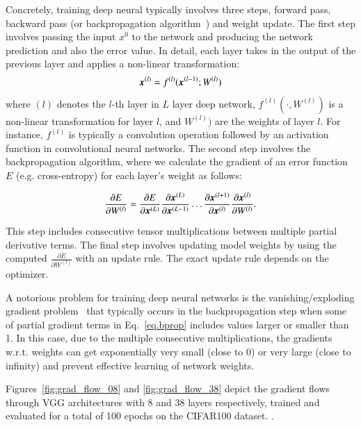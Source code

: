 \documentclass{article}
\begin{document}
\questionFigureThree

Concretely, training deep neural typically involves three steps, forward
pass, backward pass (or backpropagation algorithm~\cite{rumelhart1986learning}) and weight update.
The first step involves passing the input $x^0$ to the network and producing 
the network prediction and also the error value.
In detail, each layer takes in the output of the previous layer and applies
a non-linear transformation:
\begin{equation}
\label{eq.fprop}
\bm{x}^{(l)} = f^{(l)}(\bm{x}^{(l-1)}; W^{(l)})    
\end{equation} 
where $(l)$ denotes the $l$-th layer in $L$ layer deep network,
$f^{(l)}(\cdot,W^{(l)})$ is 
a non-linear transformation for layer $l$, and $W^{(l)})$ are the 
weights of layer $l$.
For instance, $f^{(l)}$ is typically a convolution operation followed by an activation
function in convolutional neural networks.
The second step involves the backpropagation algorithm, where we calculate
the gradient of an error function $E$ (e.g. cross-entropy) for each layer's
weight as follows:

\begin{equation}
    \label{eq.bprop}
\frac{\partial E}{\partial W^{(l)}} = \frac{\partial E}{\partial \bm{x}^{(L)}} \frac{\partial \bm{x}^{(L)}}{\partial \bm{x}^{(L-1)}} \dots \frac{\partial \bm{x}^{(l+1)}}{\partial \bm{x}^{(l)}}\frac{\partial \bm{x}^{(l)}}{\partial W^{(l)}}.
\end{equation}

This step includes consecutive tensor multiplications between multiple
partial derivative terms.
The final step involves updating model weights by using the computed 
$\frac{\partial E}{\partial W^{(l)}}$ with an update rule.
The exact update rule depends on the optimizer.

A notorious problem for training deep neural networks is the vanishing/exploding gradient
problem~\cite{bengio1993problem} that typically occurs in the backpropagation step when some of partial gradient terms in Eq.~\ref{eq.bprop} includes values larger or smaller than 1.
In this case, due to the multiple consecutive multiplications, the gradients w.r.t. weights
can get exponentially very small (close to 0) or very large (close to infinity) and
prevent effective learning of network weights.


%


Figures~\ref{fig:grad_flow_08} and \ref{fig:grad_flow_38} depict the gradient flows through
VGG architectures \cite{simonyan2014very} with 8 and 38 layers respectively,
trained and evaluated for a total of 100 epochs on the 
CIFAR100 dataset. \questionOne.
\end{document}

